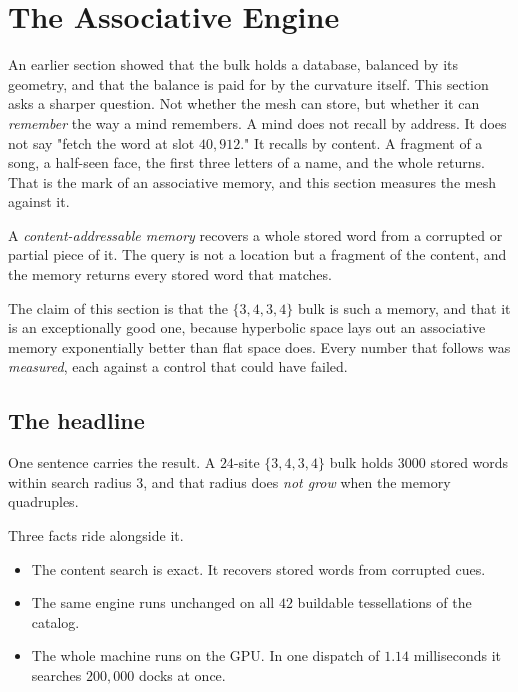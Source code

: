\section{The Associative Engine}

An earlier section showed that the bulk holds a database, balanced by its geometry, and that the balance is paid for by the curvature itself. This section asks a sharper question. Not whether the mesh can store, but whether it can \emph{remember} the way a mind remembers. A mind does not recall by address. It does not say "fetch the word at slot $40{,}912$." It recalls by content. A fragment of a song, a half-seen face, the first three letters of a name, and the whole returns. That is the mark of an associative memory, and this section measures the mesh against it.

\begin{definition}
A \emph{content-addressable memory} recovers a whole stored word from a corrupted or partial piece of it. The query is not a location but a fragment of the content, and the memory returns every stored word that matches.
\end{definition}

The claim of this section is that the $\{3,4,3,4\}$ bulk is such a memory, and that it is an exceptionally good one, because hyperbolic space lays out an associative memory exponentially better than flat space does. Every number that follows was \emph{measured}, each against a control that could have failed.

\subsection{The headline}

One sentence carries the result. A $24$-site $\{3,4,3,4\}$ bulk holds $3000$ stored words within search radius $3$, and that radius does \emph{not grow} when the memory quadruples.

Three facts ride alongside it.

\begin{itemize}
\item The content search is exact. It recovers stored words from corrupted cues.
\item The same engine runs unchanged on all $42$ buildable tessellations of the catalog.
\item The whole machine runs on the GPU. In one dispatch of $1.14$ milliseconds it searches $200{,}000$ docks at once.
\end{itemize}


